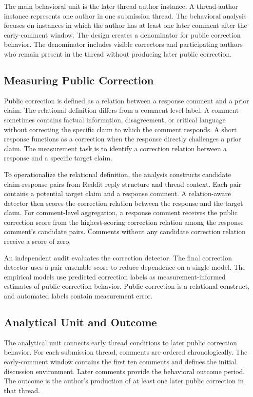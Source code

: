 \documentclass[namedate,unnumsec,webpdf,contemporary,large]{oup-authoring-template}
\begin{document}
The main behavioral unit is the later thread-author instance. A thread-author instance represents one author in one submission thread. The behavioral analysis focuses on instances in which the author has at least one later comment after the early-comment window. The design creates a denominator for public correction behavior. The denominator includes visible correctors and participating authors who remain present in the thread without producing later public correction.

\subsection{Measuring Public Correction}


Public correction is defined as a relation between a response comment and a prior claim. The relational definition differs from a comment-level label. A comment sometimes contains factual information, disagreement, or critical language without correcting the specific claim to which the comment responds. A short response functions as a correction when the response directly challenges a prior claim. The measurement task is to identify a correction relation between a response and a specific target claim.

To operationalize the relational definition, the analysis constructs candidate claim-response pairs from Reddit reply structure and thread context. Each pair contains a potential target claim and a response comment. A relation-aware detector then scores the correction relation between the response and the target claim. For comment-level aggregation, a response comment receives the public correction score from the highest-scoring correction relation among the response comment's candidate pairs. Comments without any candidate correction relation receive a score of zero.

An independent audit evaluates the correction detector. The final correction detector uses a pair-ensemble score to reduce dependence on a single model. The empirical models use predicted correction labels as measurement-informed estimates of public correction behavior. Public correction is a relational construct, and automated labels contain measurement error.

\subsection{Analytical Unit and Outcome}


The analytical unit connects early thread conditions to later public correction behavior. For each submission thread, comments are ordered chronologically. The early-comment window contains the first ten comments and defines the initial discussion environment. Later comments provide the behavioral outcome period. The outcome is the author's production of at least one later public correction in that thread.
\end{document}
